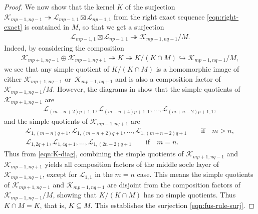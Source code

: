 \documentclass[pdftex]{sigma}
\numberwithin{equation}{section}
\theoremstyle{definition}
\begin{document}
\begin{proof}
We now show that the kernel $K$ of the surjection $\mathcal{K}_{mp-1,nq-1}\twoheadrightarrow\mathcal{L}_{mp-1,1}\boxtimes\mathcal{L}_{np-1,1}$ from
 the right exact sequence \eqref{eqn:right-exact} is contained in $M$, so that we get a surjection
 \begin{gather}\label{eqn:fus-rule-surj}
 \mathcal{L}_{mp-1,1}\boxtimes\mathcal{L}_{np-1,1}\twoheadrightarrow\mathcal{K}_{mp-1,nq-1}/M.
 \end{gather}
 Indeed, by considering the composition
 \begin{gather*}
 \mathcal{K}_{mp+1,nq-1}\oplus\mathcal{K}_{mp-1,nq+1}\twoheadrightarrow K\twoheadrightarrow K/(K\cap M)\hookrightarrow \mathcal{K}_{mp-1,nq-1}/M,
 \end{gather*}
 we see that any simple quotient of $K/(K\cap M)$ is a homomorphic image of either $\mathcal{K}_{mp+1,nq-1}$ or~$\mathcal{K}_{mp-1,nq+1}$ and is also a composition factor of $\mathcal{K}_{mp-1,nq-1}/M$. However, the diagrams in \cite[Section 2.3]{MS-cpq-Vir} show that the simple quotients of $\mathcal{K}_{mp+1,nq-1}$ are
\begin{gather*}
\mathcal{L}_{(m-n+2)p+1,1},\mathcal{L}_{(m-n+4)p+1,1},\ldots,\mathcal{L}_{(m+n-2)p+1,1},
\end{gather*}
and the simple quotients of $\mathcal{K}_{mp-1,nq+1}$ are
\begin{gather}
\mathcal{L}_{1,(m-n)q+1},\mathcal{L}_{1,(m-n+2)q+1},\ldots,\mathcal{L}_{1,(m+n-2)q+1}\qquad \text{if}\quad m>n,\nonumber\\
\mathcal{L}_{1,2q+1},\mathcal{L}_{1,4q+1},\ldots,\mathcal{L}_{1,(2n-2)q+1}\qquad \text{if} \quad m=n.\label{eqn:comp-factors}
\end{gather}
Thus from \eqref{eqn:K-diag}, combining the simple quotients of $\mathcal{K}_{mp+1,nq-1}$ and $\mathcal{K}_{mp-1,nq+1}$ yields all composition factors of the middle socle layer of $\mathcal{K}_{mp-1,nq-1}$, except for $\mathcal{L}_{1,1}$ in the $m=n$ case. This means the simple quotients of $\mathcal{K}_{mp+1,nq-1}$ and $\mathcal{K}_{mp-1,nq+1}$ are disjoint from the composition factors of $\mathcal{K}_{mp-1,nq-1}/M$, showing that $K/(K\cap M)$ has no simple quotients. Thus $K\cap M = K$, that is, $K\subseteq M$. This establishes the surjection \eqref{eqn:fus-rule-surj}.


\end{proof}
\end{document}
